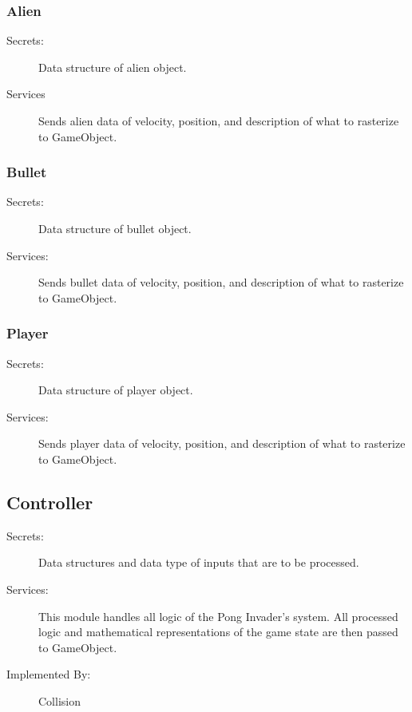 \documentclass[12pt, titlepage]{article}
\begin{document}
\subsubsection{Alien}
\begin{description}
\item[Secrets:] Data structure of alien object.
\item[Services] Sends alien data of velocity, position, and description of what to rasterize to GameObject.
\end{description}

\subsubsection{Bullet}
\begin{description}
\item[Secrets:] Data structure of bullet object.
\item[Services:] Sends bullet data of velocity, position, and description of what to rasterize to GameObject.
\end{description}

\subsubsection{Player}
\begin{description}
\item[Secrets:] Data structure of player object.
\item[Services:] Sends player data of velocity, position, and description of what to rasterize to GameObject.
\end{description}

\subsection{Controller}
\begin{description}
\item[Secrets:] Data structures and data type of inputs that are to be processed.
\item[Services:] This module handles all logic of the Pong Invader's system. All processed logic and mathematical representations of the game state are then passed to GameObject. 
\item[Implemented By:] Collision
\end{description}
\end{document}
